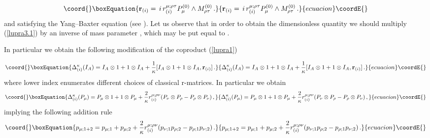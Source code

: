 \documentclass[a4paper,a4paper]{article}
\begin{document}
\begin{equation}\coord{}\boxEquation{\label{lupra3.1}
{\bf r}_{(i)} = \, i\, r^{\mu;\rho\tau}_{(i)}  P^{(0)}_{\mu}\wedge
M^{(0)}_{\rho\tau}\, .
}{{\bf r}_{(i)} = \, i\, r^{\mu;\rho\tau}_{(i)}  P^{(0)}_{\mu}\wedge
M^{(0)}_{\rho\tau}\, .
}{ecuacion}\coordE{}\end{equation}
and satisfying  the Yang--Baxter equation (see \cite{zak}). Let us
observe that in order to obtain the   dimensionless quantity we
should multiply (\ref{lupra3.1}) by an inverse of mass parameter
\myHighlight{$\chi$}\coordHE{}, which may be  put equal to \coordHE{}.

In particular we obtain the following modification of the
coproduct (\ref{lupra1})

\begin{equation}\coord{}\boxEquation{\label{lupra3.2}
  \Delta^{\kappa}_{(i)} (I_A) =
  I_A \otimes 1 + 1 \otimes I_A  +  \frac{1}{\kappa}
[ I_A \otimes 1 + 1 \otimes I_A, {\bf r}_{(i)} ]\, .
}{\Delta^{\kappa}_{(i)} (I_A) =
  I_A \otimes 1 + 1 \otimes I_A  +  \frac{1}{\kappa}
[ I_A \otimes 1 + 1 \otimes I_A, {\bf r}_{(i)} ]\, .
}{ecuacion}\coordE{}\end{equation}
where lower index \coordHE{} enumerates different choices of %
 classical r-matrices.
In particular we obtain
\begin{equation}\coord{}\boxEquation{\label{lupra3.3}
  \Delta^{\kappa}_{(i)} (P_\mu) =
  P_\mu \otimes 1 + 1 \otimes P_\mu + \frac{2}{\kappa}
  r^{\mu;\rho \nu}_{(i)}
  (P_\nu \otimes P_\rho - P_\rho \otimes P_\nu )\, ,
}{\Delta^{\kappa}_{(i)} (P_\mu) =
  P_\mu \otimes 1 + 1 \otimes P_\mu + \frac{2}{\kappa}
  r^{\mu;\rho \nu}_{(i)}
  (P_\nu \otimes P_\rho - P_\rho \otimes P_\nu )\, ,
}{ecuacion}\coordE{}\end{equation}
implying the following addition rule
\begin{equation}\coord{}\boxEquation{\label{lupra3.4}
p_{\mu;1+2} = p_{\mu;1}  + p_{\mu;2}  + \frac{2}{\kappa}
r^{\mu;\rho\nu}_{(i)} (p_{\nu;1}  p_{\rho;2} - p_{\rho;1}
p_{\nu;2} )\, .
}{p_{\mu;1+2} = p_{\mu;1}  + p_{\mu;2}  + \frac{2}{\kappa}
r^{\mu;\rho\nu}_{(i)} (p_{\nu;1}  p_{\rho;2} - p_{\rho;1}
p_{\nu;2} )\, .
}{ecuacion}\coordE{}\end{equation}
\end{document}
